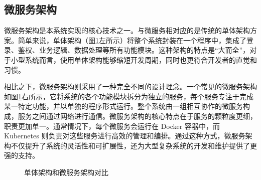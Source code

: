 \documentclass[UTF8,a4paper,12pt]{ctexart}
\numberwithin{equation}{section}
\begin{document}
\subsection{微服务架构}
微服务架构是本系统实现的核心技术之一。与微服务相对应的是传统的单体架构方案。简单来说，单体架构（图\ref{compare}左所示）将整个系统封装在一个程序中，集成了登录、鉴权、业务逻辑、数据处理等所有功能模块。这种架构的特点是“大而全”，对于小型系统而言，使用单体架构能够缩短开发周期，同时也更符合开发者的直觉和习惯。\par
相比之下，微服务架构则采用了一种完全不同的设计理念。一个常见的微服务架构如图\ref{compare}右所示，它将系统的各个功能模块拆分为独立的服务，每个服务专注于完成某一特定功能，并以单独的程序形式运行。整个系统由一组相互协作的微服务构成，服务之间通过网络进行通信。微服务架构的核心特点在于服务的颗粒度更细，职责更加单一。通常情况下，每个微服务会运行在 Docker 容器中，而 Kubernetes 则负责对这些服务进行高效的管理和编排。通过这种方式，微服务架构不仅提升了系统的灵活性和可扩展性，还为大型复杂系统的开发和维护提供了更强的支持。\par
\begin{figure}[H]
	\caption{单体架构和微服务架构对比}
	\label{compare}
\end{figure}
\end{document}

